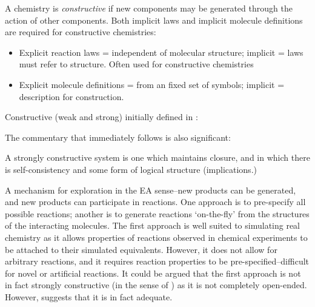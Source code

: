 A chemistry is \textit{constructive} \autocite{Fontana1994} if new components
may be generated through the action of other components. Both implicit
laws and implicit molecule definitions are required for constructive
chemistries:

\begin{itemize}
	\item
 Explicit reaction laws = independent of molecular structure; implicit
 = laws must refer to structure. Often used for constructive
 chemistries
	\item
 Explicit molecule definitions = from an fixed set of symbols; implicit
 = description for construction.
\end{itemize}

Constructive (weak and strong) initially defined in \autocite{Fontana1994}:

{\autocite{Fontana1994}}

The commentary that immediately follows is also significant:

{\autocite[217]{Fontana1994}}

A strongly constructive system is one which maintains closure, and in
which there is self-consistency and some form of logical structure
(implications.)

A mechanism for exploration in the EA sense--new products can be
generated, and new products can participate in reactions. One approach
is to pre-specify all possible reactions; another is to generate
reactions `on-the-fly' from the structures of the interacting molecules.
The first approach is well suited to simulating real chemistry as it
allows properties of reactions observed in chemical experiments to be
attached to their simulated equivalents. However, it does not allow for
arbitrary reactions, and it requires reaction properties to be
pre-specified--difficult for novel or artificial reactions. It could be
argued that the first approach is not in fact strongly constructive (in
the sense of \autocite{Fontana1994,Dittrich:2001zr}) as it is not completely
open-ended. However, \autocite{Hartenfeller2011} suggests that it is in fact
adequate.

